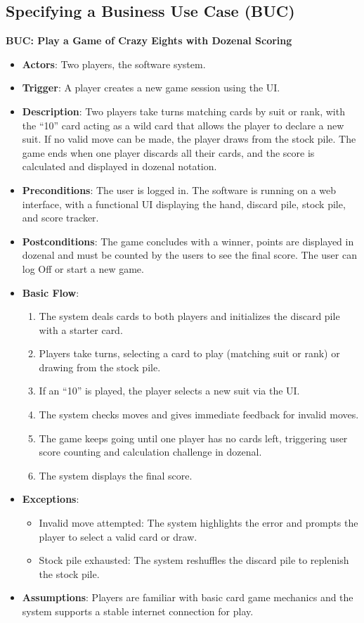 \documentclass[12pt]{article}
\begin{document}
\subsection{Specifying a Business Use Case (BUC)}

\textbf{BUC: Play a Game of Crazy Eights with Dozenal Scoring}

\begin{itemize}
    \item \textbf{Actors}: Two players, the software system.
    \item \textbf{Trigger}: A player creates a new game session using the UI.
    \item \textbf{Description}: Two players take turns matching cards by suit or rank, with the ``10'' card acting as a wild card that allows the player to declare a new suit. If no valid move can be made, the player draws from the stock pile. The game ends when one player discards all their cards, and the score is calculated and displayed in dozenal notation.
    \item \textbf{Preconditions}: The user is logged in. The software is running on a web interface, with a functional UI displaying the hand, discard pile, stock pile, and score tracker.
    \item \textbf{Postconditions}: The game concludes with a winner, points are displayed in dozenal and must be counted by the users to see the final score. The user can log Off or start a new game.
    \item \textbf{Basic Flow}:
    \begin{enumerate}
        \item The system deals cards to both players and initializes the discard pile with a starter card.
        \item Players take turns, selecting a card to play (matching suit or rank) or drawing from the stock pile.
        \item If an ``10'' is played, the player selects a new suit via the UI.
        \item The system checks moves and gives immediate feedback for invalid moves.
        \item The game keeps going until one player has no cards left, triggering user score counting and calculation challenge in dozenal.
        \item The system displays the final score.
    \end{enumerate}
    \item \textbf{Exceptions}:
    \begin{itemize}
        \item Invalid move attempted: The system highlights the error and prompts the player to select a valid card or draw.
        \item Stock pile exhausted: The system reshuffles the discard pile to replenish the stock pile.
    \end{itemize}
    \item \textbf{Assumptions}: Players are familiar with basic card game mechanics and the system supports a stable internet connection for play.
\end{itemize}
\end{document}
